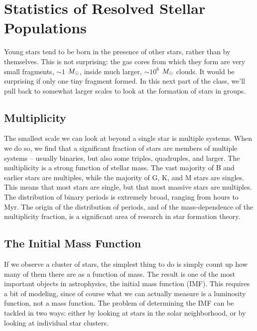 \section{Statistics of Resolved Stellar Populations}

Young stars tend to be born in the presence of other stars, rather than by themselves. This is not surprising: the gas cores from which they form are very small fragments, $\sim 1$ $M_{\odot}$, inside much larger, $\sim 10^6$ $M_{\odot}$ clouds. It would be surprising if only one tiny fragment formed. In this next part of the class, we'll pull back to somewhat larger scales to look at the formation of stars in groups.

\subsection{Multiplicity}

The smallest scale we can look at beyond a single star is multiple systems. When we do so, we find that a significant fraction of stars are members of multiple systems -- usually binaries, but also some triples, quadruples, and larger. The multiplicity is a strong function of stellar mass. The vast majority of B and earlier stars are multiples, while the majority of G, K, and M stars are singles. This means that most stars are single, but that most massive stars are multiples. The distribution of binary periods is extremely broad, ranging from hours to Myr. The origin of the distribution of periods, and of the mass-dependence of the multiplicity fraction, is a significant area of research in star formation theory.

\subsection{The Initial Mass Function}

If we observe a cluster of stars, the simplest thing to do is simply count up how many of them there are as a function of mass. The result is one of the most important objects in astrophysics, the initial mass function (IMF). This requires a bit of modeling, since of course what we can actually measure is a luminosity function, not a mass function. The problem of determining the IMF can be tackled in two ways: either by looking at stars in the solar neighborhood, or by looking at individual star clusters.

